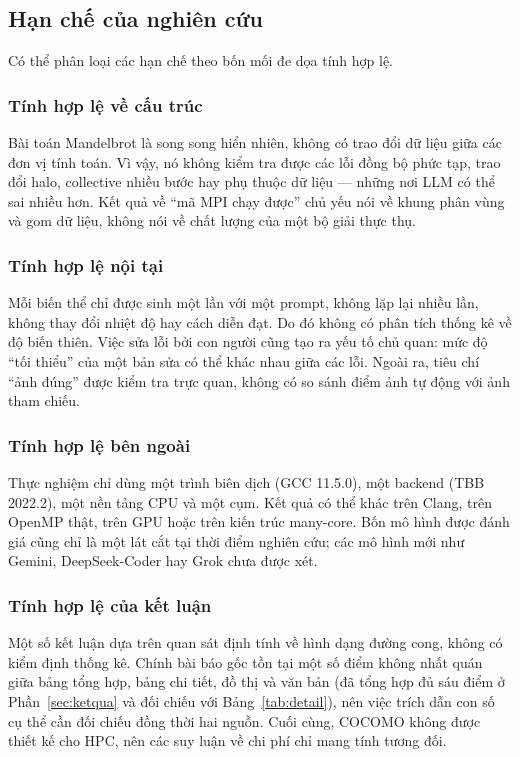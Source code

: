 \subsection{Hạn chế của nghiên cứu}

Có thể phân loại các hạn chế theo bốn mối đe dọa tính hợp lệ.

\subsubsection{Tính hợp lệ về cấu trúc}

Bài toán Mandelbrot là song song hiển nhiên, không có trao đổi dữ liệu giữa các
đơn vị tính toán. Vì vậy, nó không kiểm tra được các lỗi đồng bộ phức tạp, trao
đổi halo, collective nhiều bước hay phụ thuộc dữ liệu — những nơi LLM có thể sai
nhiều hơn. Kết quả về “mã MPI chạy được” chủ yếu nói về khung phân vùng và gom
dữ liệu, không nói về chất lượng của một bộ giải thực thụ.

\subsubsection{Tính hợp lệ nội tại}

Mỗi biến thể chỉ được sinh một lần với một prompt, không lặp lại nhiều lần, không
thay đổi nhiệt độ hay cách diễn đạt. Do đó không có phân tích thống kê về độ biến
thiên. Việc sửa lỗi bởi con người cũng tạo ra yếu tố chủ quan: mức độ “tối thiểu”
của một bản sửa có thể khác nhau giữa các lỗi. Ngoài ra, tiêu chí “ảnh đúng” được
kiểm tra trực quan, không có so sánh điểm ảnh tự động với ảnh tham chiếu.

\subsubsection{Tính hợp lệ bên ngoài}

Thực nghiệm chỉ dùng một trình biên dịch (GCC 11.5.0), một backend (TBB 2022.2),
một nền tảng CPU và một cụm. Kết quả có thể khác trên Clang, trên OpenMP thật,
trên GPU hoặc trên kiến trúc many-core. Bốn mô hình được đánh giá cũng chỉ là một
lát cắt tại thời điểm nghiên cứu; các mô hình mới như Gemini, DeepSeek-Coder hay
Grok chưa được xét.

\subsubsection{Tính hợp lệ của kết luận}

Một số kết luận dựa trên quan sát định tính về hình dạng đường cong, không có
kiểm định thống kê. Chính bài báo gốc tồn tại một số điểm không nhất quán giữa
bảng tổng hợp, bảng chi tiết, đồ thị và văn bản (đã tổng hợp đủ sáu điểm ở
Phần~\ref{sec:ketqua} và đối chiếu với Bảng~\ref{tab:detail}), nên việc trích dẫn
con số cụ thể cần đối chiếu đồng thời hai nguồn. Cuối cùng, COCOMO không được
thiết kế cho HPC, nên các suy luận về chi phí chỉ mang tính tương đối.
